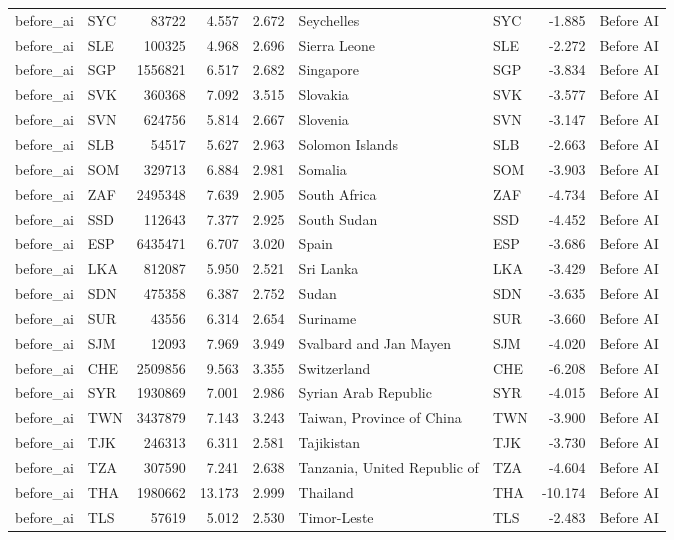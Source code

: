 \begin{tabular}{llrrrllrl}
before\_ai & SYC & 83722 & 4.557 & 2.672 & Seychelles & SYC & -1.885 & Before AI \\
before\_ai & SLE & 100325 & 4.968 & 2.696 & Sierra Leone & SLE & -2.272 & Before AI \\
before\_ai & SGP & 1556821 & 6.517 & 2.682 & Singapore & SGP & -3.834 & Before AI \\
before\_ai & SVK & 360368 & 7.092 & 3.515 & Slovakia & SVK & -3.577 & Before AI \\
before\_ai & SVN & 624756 & 5.814 & 2.667 & Slovenia & SVN & -3.147 & Before AI \\
before\_ai & SLB & 54517 & 5.627 & 2.963 & Solomon Islands & SLB & -2.663 & Before AI \\
before\_ai & SOM & 329713 & 6.884 & 2.981 & Somalia & SOM & -3.903 & Before AI \\
before\_ai & ZAF & 2495348 & 7.639 & 2.905 & South Africa & ZAF & -4.734 & Before AI \\
before\_ai & SSD & 112643 & 7.377 & 2.925 & South Sudan & SSD & -4.452 & Before AI \\
before\_ai & ESP & 6435471 & 6.707 & 3.020 & Spain & ESP & -3.686 & Before AI \\
before\_ai & LKA & 812087 & 5.950 & 2.521 & Sri Lanka & LKA & -3.429 & Before AI \\
before\_ai & SDN & 475358 & 6.387 & 2.752 & Sudan & SDN & -3.635 & Before AI \\
before\_ai & SUR & 43556 & 6.314 & 2.654 & Suriname & SUR & -3.660 & Before AI \\
before\_ai & SJM & 12093 & 7.969 & 3.949 & Svalbard and Jan Mayen & SJM & -4.020 & Before AI \\
before\_ai & CHE & 2509856 & 9.563 & 3.355 & Switzerland & CHE & -6.208 & Before AI \\
before\_ai & SYR & 1930869 & 7.001 & 2.986 & Syrian Arab Republic & SYR & -4.015 & Before AI \\
before\_ai & TWN & 3437879 & 7.143 & 3.243 & Taiwan, Province of China & TWN & -3.900 & Before AI \\
before\_ai & TJK & 246313 & 6.311 & 2.581 & Tajikistan & TJK & -3.730 & Before AI \\
before\_ai & TZA & 307590 & 7.241 & 2.638 & Tanzania, United Republic of & TZA & -4.604 & Before AI \\
before\_ai & THA & 1980662 & 13.173 & 2.999 & Thailand & THA & -10.174 & Before AI \\
before\_ai & TLS & 57619 & 5.012 & 2.530 & Timor-Leste & TLS & -2.483 & Before AI \\

\end{tabular}
